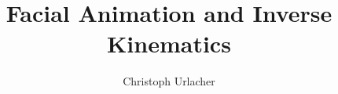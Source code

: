 \documentclass{class/thesis}
\begin{document}
\begin{thesis}


  \renewcommand{\figureautorefname}{Figure}
  \renewcommand{\tableautorefname}{Table}
  \renewcommand{\partautorefname}{Part}
  \renewcommand{\appendixautorefname}{Appendix}
  \renewcommand{\chapterautorefname}{Chapter}
  \renewcommand{\sectionautorefname}{Section}
  \renewcommand{\subsectionautorefname}{Section}
  \renewcommand{\subsubsectionautorefname}{Section}
  \makeatletter\newcommand{\tcb@cnt@codeblockautorefname}{Listing}\makeatother

  \title{Facial Animation and Inverse Kinematics}
  \author{Christoph Urlacher}

  \setcounter{page}{0}
  \maketitle
  \clearpage
  \setcounter{page}{1}



\end{thesis}
\end{document}

